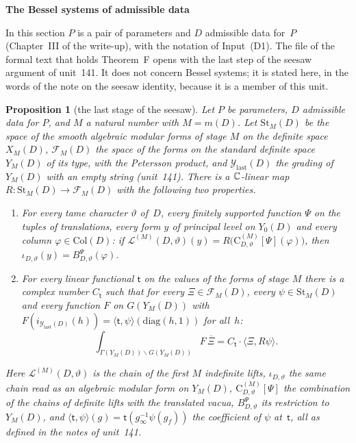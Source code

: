 \documentclass[11pt,a4paper]{article}
\newcommand{\sect}[2]{\refstepcounter{section}\label{#2}\par\addvspace{19pt plus 4pt minus 2pt}\Needspace{7\baselineskip}%
  \noindent\llap{{\fontsize{13.2}{16}\selectfont\bfseries\color{inkfaint}\thesection}\hspace{9pt}}%
  {\fontsize{13.2}{16}\selectfont\bfseries\color{ink}#1}\par\nopagebreak\vspace{-1pt}}
\theoremstyle{plainx}
\newtheorem{proposition}[theorem]{Proposition}
\theoremstyle{uprightx}
\newcommand{\Inp}[1]{\textup{(#1)}}
\newcommand{\Dm}[1]{m(#1)}
\newcommand{\Ys}[2]{Y_{#2}(#1)}                       %
\newcommand{\Stg}[2]{\mathrm{St}_{#2}(#1)}            %
\newcommand{\FormY}[2]{\mathcal{F}_{#2}(#1)}          %
\newcommand{\Col}[1]{\mathrm{Col}(#1)}                %
\newcommand{\chcomb}[4]{\mathrm{C}^{(#4)}_{#1,#2}[#3]} %
\newcommand{\chainY}[3]{\mathcal{L}^{(#3)}(#1,#2)}    %
\newcommand{\iot}[2]{\iota_{#1,#2}}                   %
\newcommand{\Bmu}[3]{B^{#3}_{#1,#2}}                  %
\newcommand{\gYlast}[1]{\mathcal{Y}_{\mathrm{last}}(#1)} %
\newcommand{\incl}[1]{i_{#1}}                         %
\newcommand{\coef}[2]{\langle #1,#2\rangle}           %
\begin{document}
\sect{The Bessel systems of admissible data}{s:degree}
In this section $P$ is a pair of parameters and $D$ admissible data for~$P$ (Chapter~III of the write-up), with the
notation of Input~\Inp{D1}. The file of the formal text that holds Theorem~F opens with the last step of the seesaw
argument of unit~141. It does not concern Bessel systems; it is stated here, in the words of the note on the seesaw
identity, because it is a member of this unit.

\begin{proposition}[the last stage of the seesaw]\label{p:last}
Let $P$ be parameters, $D$ admissible data for $P$, and $M$ a natural number with $M=\Dm{D}$. Let $\Stg{D}{M}$ be
the space of the smooth algebraic modular forms of stage $M$ on the definite space $X_M(D)$, $\FormY{D}{M}$ the space
of the forms on the standard definite space $\Ys{D}{M}$ of its type, with the Petersson product, and
$\gYlast{D}$ the grading of $\Ys{D}{M}$ with an empty string (unit~141). There is a $\mathbb{C}$-linear map
$R\colon\Stg{D}{M}\to\FormY{D}{M}$ with the following two properties.
\begin{enumerate}[label=(\arabic*),leftmargin=2.2em,itemsep=1pt,topsep=2pt]
\item For every tame character $\vartheta$ of~$D$, every finitely supported function $\Psi$ on the tuples of
  translations, every form $y$ of principal level on $\Ys{D}{0}$ and every column $\varphi\in\Col{D}$: if
  $\chainY{D}{\vartheta}{M}(y)=R\bigl(\chcomb{D}{\vartheta}{\Psi}{M}(\varphi)\bigr)$, then
  $\iot{D}{\vartheta}(y)=\Bmu{D}{\vartheta}{\Psi}(\varphi)$.
\item For every linear functional $\mathsf{t}$ on the values of the forms of stage $M$ there is a complex number
  $C_{\mathsf{t}}$ such that for every $\Xi\in\FormY{D}{M}$, every $\psi\in\Stg{D}{M}$ and every function $F$ on
  $G(\Ys{D}{M})$ with $F(\incl{\gYlast{D}}(h))=\coef{\mathsf{t}}{\psi}(\mathrm{diag}(h,1))$ for all~$h$:
  \[\int_{\Gamma(\Ys{D}{M})\backslash G(\Ys{D}{M})}F\,\overline{\Xi}=C_{\mathsf{t}}\cdot\langle\Xi,R\psi\rangle.\]
\end{enumerate}
Here $\chainY{D}{\vartheta}{M}$ is the chain of the first $M$ indefinite lifts, $\iot{D}{\vartheta}$ the same chain read
as an algebraic modular form on $\Ys{D}{M}$, $\chcomb{D}{\vartheta}{\Psi}{M}$ the combination of the chains of definite
lifts with the translated vacua, $\Bmu{D}{\vartheta}{\Psi}$ its restriction to $\Ys{D}{M}$, and
$\coef{\mathsf{t}}{\psi}(g)=\mathsf{t}(g_\infty^{-1}\psi(g_f))$ the coefficient of $\psi$ at~$\mathsf{t}$, all as defined in
the notes of unit~141.
\end{proposition}
\end{document}
